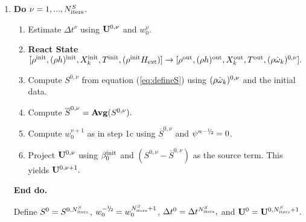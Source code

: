 \begin{enumerate}
\renewcommand{\theenumi}{{\bf \alph{enumi}}}
\renewcommand{\labelenumii}{\roman{enumii}.}

\item {\bf Do} {$\nu = 1,...,N_{\rm iters}^{S}$.}
  \begin{enumerate}

  \item Estimate $\Delta t^\nu$ using ${\bf U}^{0,\nu}$ and $w_0^\nu.$

  \item {\bf React State}$[ \rho^{\mathrm{init}},(\rho h)^{\mathrm{init}}, X_k^{\mathrm{init}}, T^{\mathrm{init}}, (\rho^{\mathrm{init}} {H_{\rm ext}}) ] \rightarrow [\rho^{\mathrm{out}}, (\rho h)^{\mathrm{out}}, X_k^{\mathrm{out}}, T^{\mathrm{out}}, (\rho \dot{\omega}_k)^{0,\nu} ].$

  \item Compute $S^{0,\nu}$ from equation (\ref{eq:defineS}) 
        using $(\rho \dot{\omega}_k)^{0,\nu}$ and the initial data.

  \item Compute $\overline{S}^{0,\nu} = {\mathrm{\bf Avg}} (S^{0,\nu}).$

  \item Compute $w_0^{\nu+1}$ as in step 1c using $\overline{S}^{0,\nu}$ and $\psi^{\nmh} = 0$.
        

  \item Project ${\bf U}^{0,\nu}$ using $\beta_0^{\mathrm{init}}$ and 
        $(S^{0,\nu} - \overline{S}^{0,\nu})$ as the source term.  
        This yields ${\bf U}^{0,\nu+1}.$

  \end{enumerate}

  {\bf End do.}

  Define $S^0 = S^{0,N_{\rm iters}^S}$, $w_0^{-\myhalf} = w_0^{N_{\rm iters}^S+1}$, 
$\Delta t^0 = \Delta t^{N_{\rm iters}^S},$ and ${\bf U}^0 = {\bf U}^{0,N_{\rm iters}^S+1}.$

\end{enumerate}

